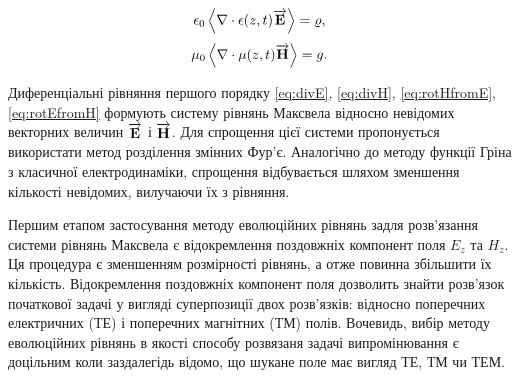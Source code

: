 %
\begin{equation} \label{eq:divE} 
\epsilon_0 \left< \nabla \cdot  \epsilon(z,t) \overrightarrow{\mathbf E}  \right> = \varrho,
\end{equation}
%
\begin{equation} \label{eq:divH}
\mu_0 \left< \nabla \cdot  \mu(z,t) \overrightarrow{\mathbf H}  \right> = g.
\end{equation}

Диференціальні рівняння першого порядку \eqref{eq:divE}, \eqref{eq:divH}, 
\eqref{eq:rotHfromE}, \eqref{eq:rotEfromH} формують систему 
рівнянь Максвела відносно невідомих векторних величин $ \overrightarrow{\mathbf E} $ і 
$ \overrightarrow{\mathbf H} $. Для спрощення цієї системи пропонується використати метод 
розділення змінних Фур'є. Аналогічно до методу функції Гріна з класичної 
електродинаміки, спрощення відбувається шляхом зменшення кількості невідомих,
вилучаючи їх з рівняння.

Першим етапом застосування методу еволюційних рівнянь задля розв'язання системи
рівнянь Максвела є відокремлення поздовжніх компонент поля $ E_z $ та $ H_z $.
Ця процедура є зменшенням розмірності рівнянь, а отже повинна збільшити їх 
кількість. Відокремлення поздовжніх компонент поля дозволить знайти розв'язок 
початкової задачі у вигляді суперпозиції двох розв'язків: відносно поперечних 
електричних (ТЕ) і поперечних магнітних (ТМ) полів. Вочевидь, вибір методу 
еволюційних рівнянь в якості способу розвязаня задачі випромінювання є 
доцільним коли заздалегідь відомо, що шукане поле має вигляд ТЕ, ТМ чи ТЕМ. 



